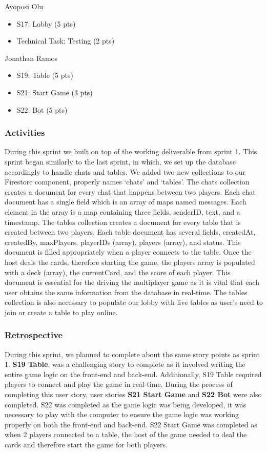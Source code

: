 Ayoposi Olu

\begin{itemize}
    \item S17: Lobby (5 pts)
    \item Technical Task: Testing (2 pts)
\end{itemize}


Jonathan Ramos

\begin{itemize}
    \item S19: Table (5 pts)
    \item S21: Start Game (3 pts)
    \item S22: Bot (5 pts)
\end{itemize}

\subsubsection{Activities}
During this sprint we built on top of the working deliverable from sprint 1. This sprint began similarly to the last sprint, in which, we set up the database accordingly to handle chats and tables. We added two new collections to our Firestore component, properly names `chats' and `tables'. The chats collection creates a document for every chat that happens between two players. Each chat document has a single field which is an array of maps named messages. Each element in the array is a map containing three fields, senderID, text, and a timestamp. The tables collection creates a document for every table that is created between two players. Each table document has several fields, createdAt, createdBy, maxPlayers, playerIDs (array), players (array), and status. This document is filled appropriately when a player connects to the table. Once the host deals the cards, therefore starting the game, the players array is populated with a deck (array), the currentCard, and the score of each player. This document is essential for the driving the multiplayer game as it is vital that each user obtains the same information from the database in real-time. The tables collection is also necessary to populate our lobby with live tables as user's need to join or create a table to play online. 


\subsubsection{Retrospective}
During this sprint, we planned to complete about the same story points as sprint 1. \textbf{S19 Table}, was a challenging story to complete as it involved writing the entire game logic on the front-end and back-end. Additionally, S19 Table required players to connect and play the game in real-time. During the process of completing this user story, user stories \textbf{S21 Start Game} and \textbf{S22 Bot} were also completed. S22 was completed as the game logic was being developed, it was necessary to play with the computer to ensure the game logic was working properly on both the front-end and back-end. S22 Start Game was completed as when 2 players connected to a table, the host of the game needed to deal the cards and therefore start the game for both players. 

